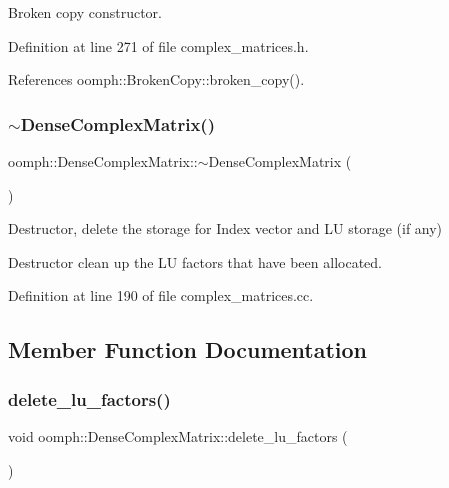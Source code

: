 Broken copy constructor. 



Definition at line 271 of file complex\+\_\+matrices.\+h.



References oomph\+::\+Broken\+Copy\+::broken\+\_\+copy().

\mbox{\label{classoomph_1_1DenseComplexMatrix_a157f9dac417c294a9082efeffc123f2d}} 
\subsubsection{\texorpdfstring{$\sim$\+Dense\+Complex\+Matrix()}{~DenseComplexMatrix()}}
{\footnotesize\ttfamily oomph\+::\+Dense\+Complex\+Matrix\+::$\sim$\+Dense\+Complex\+Matrix (\begin{DoxyParamCaption}{ }\end{DoxyParamCaption})\hspace{0.3cm}{\ttfamily [virtual]}}



Destructor, delete the storage for Index vector and LU storage (if any) 

Destructor clean up the LU factors that have been allocated. 

Definition at line 190 of file complex\+\_\+matrices.\+cc.



\subsection{Member Function Documentation}
\mbox{\label{classoomph_1_1DenseComplexMatrix_aae7ac20408c4459c59c505f1d40caa80}} 
\subsubsection{\texorpdfstring{delete\+\_\+lu\+\_\+factors()}{delete\_lu\_factors()}}
{\footnotesize\ttfamily void oomph\+::\+Dense\+Complex\+Matrix\+::delete\+\_\+lu\+\_\+factors (\begin{DoxyParamCaption}{ }\end{DoxyParamCaption})\hspace{0.3cm}{\ttfamily [private]}}

